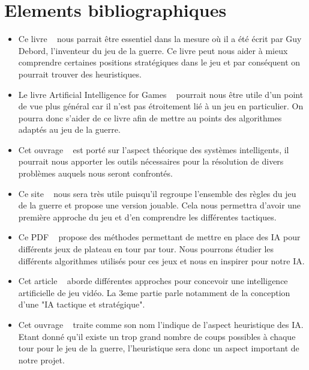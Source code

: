 \documentclass[12pt]{article}
\begin{document}
\section{Elements bibliographiques}
\begin{itemize}
\item Ce livre ~\cite{ref1} nous parrait être essentiel dans la mesure où il a été écrit par Guy Debord, l'inventeur du jeu de la guerre. Ce livre peut nous aider à mieux comprendre certaines positions stratégiques dans le jeu et par conséquent on pourrait trouver des heuristiques. 
\\[1\baselineskip]

\item Le livre Artificial Intelligence for Games ~\cite{ref2} pourrait nous être utile d'un point de vue plus général car il n'est pas étroitement lié à un jeu en particulier. On pourra donc s'aider de ce livre afin de mettre au points des algorithmes adaptés au jeu de la guerre.\\[1\baselineskip]

\item Cet ouvrage ~\cite{ref3} est porté sur l'aspect théorique des systèmes intelligents, il pourrait nous apporter les outils nécessaires pour la résolution de divers problèmes auquels nous seront confrontés.\\[1\baselineskip]

\item Ce site ~\cite{ref4} nous sera très utile puisqu'il regroupe l'ensemble des règles du jeu de la guerre et propose une version jouable. Cela nous permettra d'avoir une première approche du jeu et d'en comprendre les différentes tactiques.\\[1\baselineskip]

\item Ce PDF ~\cite{ref5} propose des méthodes permettant de mettre en place des IA pour différents jeux de plateau en tour par tour. Nous pourrons étudier les différents algorithmes utilisés pour ces jeux et nous en inspirer pour notre IA.\\[1\baselineskip]

\item Cet article ~\cite{ref6} aborde différentes approches pour concevoir une intelligence artificielle de jeu vidéo. La 3eme partie parle notamment de la conception d'une "IA tactique et stratégique".\\[1\baselineskip]

\item Cet ouvrage ~\cite{ref7} traite comme son nom l'indique de l'aspect heuristique des IA. Etant donné qu'il existe un trop grand nombre de coups possibles à chaque tour pour le jeu de la guerre, l'heuristique sera donc un aspect important de notre projet.\\[1\baselineskip]


\end{itemize}
\end{document}
